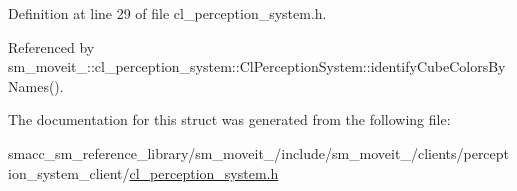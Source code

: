 Definition at line 29 of file cl\+\_\+perception\+\_\+system.\+h.



Referenced by sm\+\_\+moveit\+\_\+::cl\+\_\+perception\+\_\+system\+::\+Cl\+Perception\+System\+::identify\+Cube\+Colors\+By\+Names().



The documentation for this struct was generated from the following file\+:\begin{DoxyCompactItemize}
\item 
smacc\+\_\+sm\+\_\+reference\+\_\+library/sm\+\_\+moveit\+\_/include/sm\+\_\+moveit\+\_/clients/perception\+\_\+system\+\_\+client/\hyperlink{4_2include_2sm__moveit__4_2clients_2perception__system__client_2cl__perception__system_8h}{cl\+\_\+perception\+\_\+system.\+h}\end{DoxyCompactItemize}
